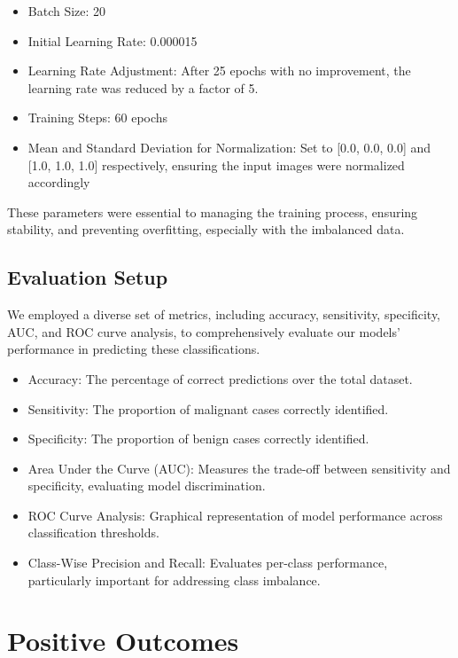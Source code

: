 \documentclass{article}
\begin{document}
\begin{itemize}
    \item Batch Size: 20
    \item Initial Learning Rate: 0.000015
    \item Learning Rate Adjustment: After 25 epochs with no improvement, the learning rate was reduced by a
factor of 5.
    \item Training Steps: 60 epochs
    \item Mean and Standard Deviation for Normalization: Set to [0.0, 0.0, 0.0] and [1.0, 1.0, 1.0] respectively,
ensuring the input images were normalized accordingly
\end{itemize}

These parameters were essential to managing the training process, ensuring stability, and preventing overfitting,
especially with the imbalanced data.

\subsection{Evaluation Setup}

We employed a diverse set of metrics, including accuracy, sensitivity, specificity, AUC, and ROC curve
analysis, to comprehensively evaluate our models' performance in predicting these classifications.

\begin{itemize}
    \item Accuracy: The percentage of correct predictions over the total dataset.
    \item Sensitivity: The proportion of malignant cases correctly identified.
    \item Specificity: The proportion of benign cases correctly identified.
    \item Area Under the Curve (AUC): Measures the trade-off between sensitivity and specificity, evaluating
model discrimination.
    \item ROC Curve Analysis: Graphical representation of model performance across classification thresholds.
    \item Class-Wise Precision and Recall: Evaluates per-class performance, particularly important for
addressing class imbalance.
\end{itemize}

\section{Positive Outcomes}
\end{document}
